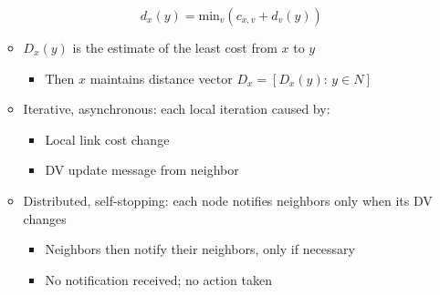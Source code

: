 \begin{itemize}
\begin{itemize}
        $$d_x(y)=\text{min}_v(c_{x,v}+d_v(y))$$

      \item $D_x(y)$ is the estimate of the least cost from $x$ to $y$

        \begin{itemize}

          \item Then $x$ maintains distance vector $D_x=[D_x(y):\,y\in N]$

        \end{itemize}

      \item Iterative, asynchronous: each local iteration caused by:

        \begin{itemize}

          \item Local link cost change

          \item DV update message from neighbor

        \end{itemize}

      \item Distributed, self-stopping: each node notifies neighbors only when its DV changes

        \begin{itemize}

          \item Neighbors then notify their neighbors, only if necessary

          \item No notification received; no action taken

        \end{itemize}

    \end{itemize}

\end{itemize}



